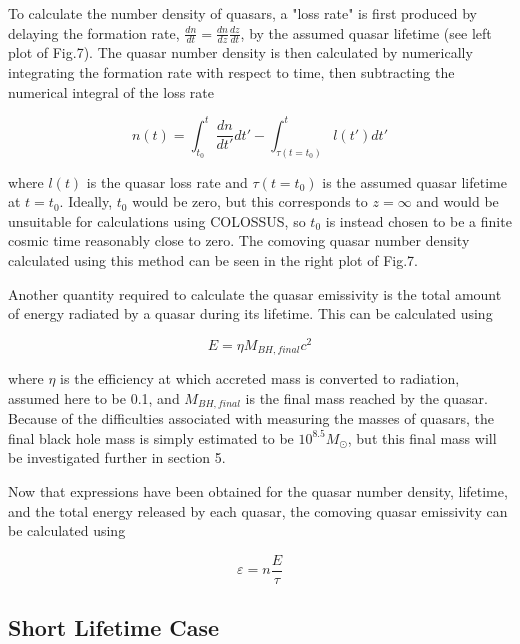 \documentclass[12pt, twocolumn]{report}%
\begin{document}
To calculate the number density of quasars, a "loss rate" is first produced by delaying the formation rate, $\frac{dn}{dt}=\frac{dn}{dz}\frac{dz}{dt}$, by the assumed quasar lifetime (see left plot of Fig.7). The quasar number density is then calculated by numerically integrating the formation rate with respect to time, then subtracting the numerical integral of the loss rate

\begin{equation}
    n(t)=\int_{t_0}^t\frac{dn}{dt'}dt'-\int_{\tau(t=t_0)}^tl(t')dt'
\end{equation}

\noindent where $l(t)$ is the quasar loss rate and $\tau(t=t_0)$ is the assumed quasar lifetime at $t=t_0$. Ideally, $t_0$ would be zero, but this corresponds to $z=\infty$ and would be unsuitable for calculations using COLOSSUS, so $t_0$ is instead chosen to be a finite cosmic time reasonably close to zero. The comoving quasar number density calculated using this method can be seen in the right plot of Fig.7.\par

Another quantity required to calculate the quasar emissivity is the total amount of energy radiated by a quasar during its lifetime. This can be calculated using

\begin{equation}
    E=\eta M_{BH,final}c^2
\end{equation}

\noindent where $\eta$ is the efficiency at which accreted mass is converted to radiation, assumed here to be 0.1, and $M_{BH,final}$ is the final mass reached by the quasar. Because of the difficulties associated with measuring the masses of quasars, the final black hole mass is simply estimated to be $10^{8.5}M_\odot$, but this final mass will be investigated further in section 5.\par

Now that expressions have been obtained for the quasar number density, lifetime, and the total energy released by each quasar, the comoving quasar emissivity can be calculated using

\begin{equation}
    \varepsilon=n\frac{E}{\tau}
\end{equation}

\subsection{Short Lifetime Case}
\end{document}
